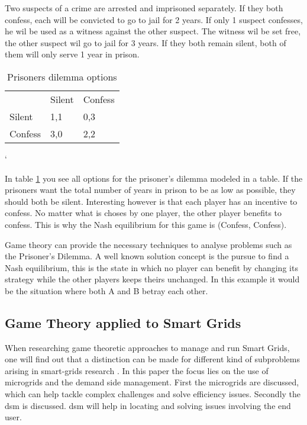 Two suspects of a crime are arrested and imprisoned separately. If they both confess, each will be convicted to go to jail for 2 years. If only 1 suspect confesses, he wil be used as a witness against the other suspect. The witness wil be set free, the other suspect wil go to jail for 3 years. If they both remain silent, both of them will only serve 1 year in prison.

\begin{table}[h]
\centering
\label{prisoners-d}
\begin{tabular}{lll}
 & Silent & Confess \\ \cline{2-3} 
\multicolumn{1}{l|}{Silent} & \multicolumn{1}{l|}{1,1} & \multicolumn{1}{l|}{0,3} \\ \cline{2-3} 
\multicolumn{1}{l|}{Confess} & \multicolumn{1}{l|}{3,0} & \multicolumn{1}{l|}{2,2} \\ \cline{2-3} 
\end{tabular}
\caption{Prisoners dilemma options}
\end{table}`

In table \ref{prisoners-d} you see all options for the prisoner's dilemma modeled in a table. If the prisoners want the total number of years in prison to be as low as possible, they should both be silent. Interesting however is that each player has an incentive to confess. No matter what is choses by one player, the other player benefits to confess. This is why the Nash equilibrium for this game is (Confess, Confess).    

Game theory can provide the necessary techniques to analyse problems such as the Prisoner's Dilemma. A well known solution concept is the pursue to find a Nash equilibrium, this is the state in which no player can benefit by changing its strategy while the other players keeps theirs unchanged. In this example it would be the situation where both A and B betray each other.




\subsection{Game Theory applied to Smart Grids}
When researching game theoretic approaches to manage and run Smart Grids, one will find out that a distinction can be made for different kind of subproblems arising in smart-grids research \cite{keypaper}. In this paper the focus lies on the use of microgrids and the demand side management. First the microgrids are discussed, which can help tackle complex challenges and solve efficiency issues. Secondly the \gls{dsm} is discussed. \gls{dsm} will help in locating and solving issues involving the end user. 


